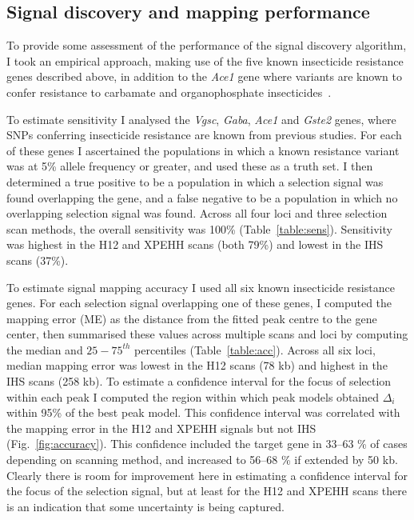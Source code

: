 \begin{refsection}
\subsection{Signal discovery and mapping performance}\label{subsec:performance}


To provide some assessment of the performance of the signal discovery algorithm, I took an empirical approach, making use of the five known insecticide resistance genes described above, in addition to the \textit{Ace1} gene where variants are known to confer resistance to carbamate and organophosphate insecticides~\parencite{Weill2003,Weill2004,Djogbenou2008}.


To estimate sensitivity I analysed the \textit{Vgsc}, \textit{Gaba}, \textit{Ace1} and \textit{Gste2} genes, where SNPs conferring insecticide resistance are known from previous studies.
%
For each of these genes I ascertained the populations in which a known resistance variant was at 5\% allele frequency or greater, and used these as a truth set.
%
I then determined a true positive to be a population in which a selection signal was found overlapping the gene, and a false negative to be a population in which no overlapping selection signal was found.
%
Across all four loci and three selection scan methods, the overall sensitivity was 100\% (Table~\ref{table:sens}).
%
Sensitivity was highest in the H12 and XPEHH scans (both 79\%) and lowest in the IHS scans (37\%).
%


To estimate signal mapping accuracy I used all six known insecticide resistance genes.
%
For each selection signal overlapping one of these genes, I computed the mapping error (ME) as the distance from the fitted peak centre to the gene center, then summarised these values across multiple scans and loci by computing the median and $25-75^{th}$ percentiles (Table~\ref{table:acc}).
%
Across all six loci, median mapping error was lowest in the H12 scans (78 kb) and highest in the IHS scans (258 kb).
%
To estimate a confidence interval for the focus of selection within each peak I computed the region within which peak models obtained $\Delta_i$ within 95\% of the best peak model.
%
This confidence interval was correlated with the mapping error in the H12 and XPEHH signals but not IHS (Fig.~\ref{fig:accuracy}).
%
This confidence included the target gene in 33--63 \% of cases depending on scanning method, and increased to 56--68 \% if extended by 50 kb.
%
Clearly there is room for improvement here in estimating a confidence interval for the focus of the selection signal, but at least for the H12 and XPEHH scans there is an indication that some uncertainty is being captured.



\end{refsection}

